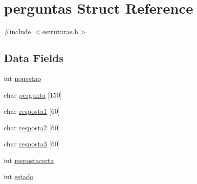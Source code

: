 \hypertarget{structperguntas}{\section{perguntas Struct Reference}
\label{structperguntas}
}


{\ttfamily \#include $<$estruturas.\+h$>$}

\subsection*{Data Fields}
\begin{DoxyCompactItemize}
\item 
int \hyperlink{structperguntas_a40f21491f206c419f22c9b47c18e0490}{nquestao}
\item 
char \hyperlink{structperguntas_a0760f9275bc627087fe8428b1e427e83}{pergunta} \mbox{[}150\mbox{]}
\item 
char \hyperlink{structperguntas_aa02825e9b2a63ed5aecd5d9862bfd3c5}{resposta1} \mbox{[}60\mbox{]}
\item 
char \hyperlink{structperguntas_a9e9762d51b0950cf63ed51125eb902f7}{resposta2} \mbox{[}60\mbox{]}
\item 
char \hyperlink{structperguntas_ac1511757017e0a5f2290fdaeb675b93b}{resposta3} \mbox{[}60\mbox{]}
\item 
int \hyperlink{structperguntas_a3e23bda5c00103b6d418157ef2743768}{respostacerta}
\item 
int \hyperlink{structperguntas_a876d08c1d21086e4fd228744da10d028}{estado}
\end{DoxyCompactItemize}


